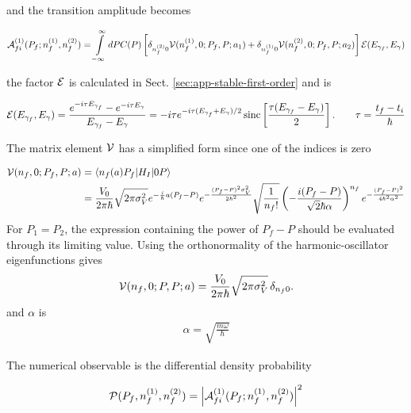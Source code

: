 and the transition amplitude becomes
\begin{importantbox}
  \begin{align}
    {\cal A}_{fi}^{(1)} (P_f;n_f^{(1)},n_f^{(2)})= \int\limits_{-\infty}^{\infty}dPC(P)\left[\delta_{n_f^{(2)}0}{\cal V}(n_f^{(1)},0;P_f,P;a_1)+\delta_{n_f^{(1)}0}{\cal V}(n_f^{(2)},0; P_f,P;a_2)\right] {\cal E}(E_{\gamma_f},E_\gamma)
  \end{align}
\end{importantbox}
the factor ${\cal E}$ is calculated in Sect. \ref{sec:app-stable-first-order} and is
\begin{importantbox}
  \begin{align} {\cal E}(E_{\gamma_f},E_\gamma)=\frac{e^{-i\tau E_{\gamma_f}}-e^{-i\tau E_\gamma}}{E_{\gamma_f}-E_\gamma} = -i\tau
    e^{-i\tau(E_{\gamma_f}+E_\gamma)/2}        \operatorname{sinc} \left[
      \frac{\tau(E_{\gamma_f}-E_{\gamma})}{2}
    \right].\qquad \tau = \frac{t_f-t_i}{\hbar}\label{eq:osc-E-factor-restated}
  \end{align}
\end{importantbox}

The matrix element $ {\cal V}$ has a simplified form since one of the indices is zero
\begin{importantbox}
  \begin{align}
    {\cal V}(n_f,0;P_f,P;a)&= \langle n_f(a) P_f|H_I|0 P\rangle  \nonumber\\
    &= \frac{V_0}{2\pi\hbar}\sqrt{{2\pi\sigma_V^2}} e^{-\frac{i}{\hbar}a(P_f-P)}e^{-\frac{(P_f-P)^2\sigma_V^2}{2\hbar^2}}\sqrt{\frac{1}{n_f!}} \left(-\frac{i (P_f-P)  }{\sqrt{2}\hbar\alpha}\right)^{n_f} e^{-\frac{(P_f-P)^2 }{4\hbar^2\alpha^2}} \label{eq:osc-V-n0}
  \end{align}
  For $P_1=P_2$, the expression containing the power of $P_f-P$
  should be evaluated through its limiting value.  Using the
  orthonormality of the harmonic-oscillator eigenfunctions gives
  \begin{align}
    {\cal V}(n_f,0;P,P;a)
    = \frac{V_0}{2\pi\hbar}\sqrt{2\pi\sigma_V^2}\,
    \delta_{n_f0}.\label{eq:osc-V-n0-diag}
  \end{align}
  and $\alpha$ is
  \begin{align}
    \alpha=\sqrt{\frac{m\omega}\hbar}
  \end{align}
\end{importantbox}
The numerical observable is the differential density probability
\begin{importantbox}
  \begin{align}
    {\cal P}(P_f, n_f^{(1)}, n_f^{(2)}) = \left|{\cal A}_{fi}^{(1)} (P_f;n_f^{(1)},n_f^{(2)})\right|^2
  \end{align}
\end{importantbox}

